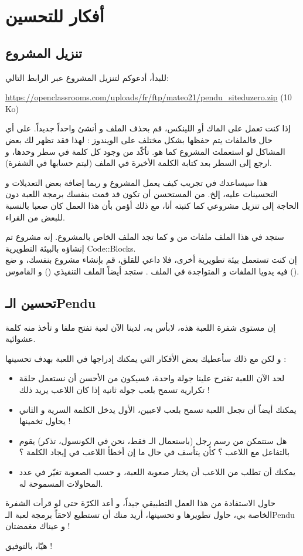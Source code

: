 \section*{أفكار للتحسين}

\subsection{تنزيل المشروع}

للبدأ، أدعوكم لتنزيل المشروع عبر الرابط التالي:

\url{https://openclassrooms.com/uploads/fr/ftp/mateo21/pendu_siteduzero.zip} \textenglish{(10 Ko)}

إذا كنت تعمل على الماك أو اللينكس، قم بحذف الملف
و أنشئ واحداً جديداً. على أي حال فالملفات يتم حفظها بشكل مختلف على الويندوز : لهذا فقد تظهر لك بعض المشاكل لو استعملت المشروع كما هو. تأكّد من وجود كل كلمة في سطر وحدها، و ارجع إلى السطر بعد كتابة الكلمة الأخيرة في الملف (ليتم حسابها في الشفرة).

هذا سيساعدك في تجريب كيف يعمل المشروع و ربما إضافة بعض التعديلات و التحسينات عليه، إلخ. من المستحسن أن تكون قد قمت بنفسك برمجة اللعبة دون الحاجة إلى تنزيل مشروعي كما كتبته أنا، مع ذلك أؤمن بأن هذا العمل كان صعبا بالنسبة للبعض من القراء.

ستجد في هذا الملف
ملفات من
 و
كما تجد الملف
الخاص بالمشروع. إنه مشروع تم إنشاؤه بالبيئة التطويرية
\textenglish{Code::Blocks}.\\
إن كنت تستعمل بيئة تطويرية أخرى، فلا داعي للقلق، قم بإنشاء مشروع بنفسك، و ضع فيه يدويا الملفات
و
المتواجدة في الملف
.
ستجد أيضاً الملف التنفيذي
()
و القاموس
().

\subsection{تحسين الـ\textenglish{Pendu}}

إن مستوى شفرة اللعبة هذه، لابأس به، لدينا الآن لعبة تفتح ملفا و تأخذ منه كلمة عشوائية.

و لكن مع ذلك سأعطيك بعض الأفكار التي يمكنك إدراجها في اللعبة بهدف تحسينها :

\begin{itemize}
  \item لحد الآن اللعبة تقترح علينا جولة واحدة، فسيكون من الأحسن أن نستعمل حلقة تكرارية تسمح بلعب جولة ثانية إذا كان اللاعب يريد ذلك !
  \item يمكنك أيضاً أن تجعل اللعبة تسمح بلعب لاعبين، الأول يدخل الكلمة السرية و الثاني يحاول تخمينها !
  \item هل ستتمكن من رسم رجل (باستعمال الـ
 فقط، نحن في الكونسول، تذكر) يقوم بالتفاعل مع اللاعب ؟ كأن يتأسف في حال ما إن أخطأ اللاعب في إيجاد الكلمة ؟
  \item يمكنك أن تطلب من اللاعب أن يختار صعوبة اللعبة، و حسب الصعوبة تغيّر في عدد المحاولات المسموحة له.
\end{itemize}

حاول الاستفادة من هذا العمل التطبيقي جيداً، و أعد الكرّة حتى لو قرأت الشفرة الخاصة بي، حاول تطويرها و تحسينها، أريد منك أن تستطيع لاحقاً برمجة لعبة الـ\textenglish{Pendu}
و عيناك مغمضتان !

هيّا، بالتوفيق !

